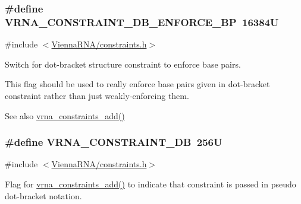 \subsubsection[{V\+R\+N\+A\+\_\+\+C\+O\+N\+S\+T\+R\+A\+I\+N\+T\+\_\+\+D\+B\+\_\+\+E\+N\+F\+O\+R\+C\+E\+\_\+\+B\+P}]{\setlength{\rightskip}{0pt plus 5cm}\#define V\+R\+N\+A\+\_\+\+C\+O\+N\+S\+T\+R\+A\+I\+N\+T\+\_\+\+D\+B\+\_\+\+E\+N\+F\+O\+R\+C\+E\+\_\+\+B\+P~16384\+U}\label{group__constraints_ga29ebe940110d60ab798fdacbcdbbfb7d}


{\ttfamily \#include $<$\hyperlink{constraints_8h}{Vienna\+R\+N\+A/constraints.\+h}$>$}



Switch for dot-\/bracket structure constraint to enforce base pairs. 

This flag should be used to really enforce base pairs given in dot-\/bracket constraint rather than just weakly-\/enforcing them.

\begin{DoxySeeAlso}{See also}
\hyperlink{group__constraints_ga35a401f680969a556858a8dd5f1d07cc}{vrna\+\_\+constraints\+\_\+add()} 
\end{DoxySeeAlso}
\hypertarget{group__constraints_ga4bfc2f15c4f261c62a11af9d2aa80c90}{}
\subsubsection[{V\+R\+N\+A\+\_\+\+C\+O\+N\+S\+T\+R\+A\+I\+N\+T\+\_\+\+D\+B}]{\setlength{\rightskip}{0pt plus 5cm}\#define V\+R\+N\+A\+\_\+\+C\+O\+N\+S\+T\+R\+A\+I\+N\+T\+\_\+\+D\+B~256\+U}\label{group__constraints_ga4bfc2f15c4f261c62a11af9d2aa80c90}


{\ttfamily \#include $<$\hyperlink{constraints_8h}{Vienna\+R\+N\+A/constraints.\+h}$>$}



Flag for \hyperlink{group__constraints_ga35a401f680969a556858a8dd5f1d07cc}{vrna\+\_\+constraints\+\_\+add()} to indicate that constraint is passed in pseudo dot-\/bracket notation. 

